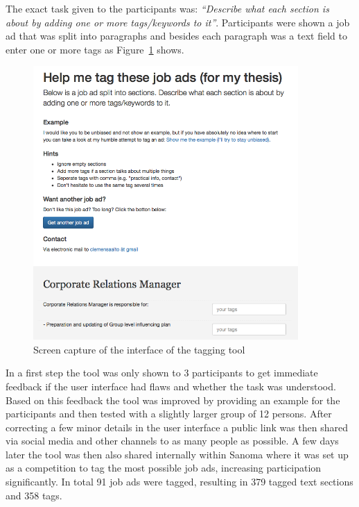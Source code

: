 The exact task given to the participants was: \emph{``Describe what each section is about by adding one or more tags/keywords to it''}. Participants were shown a job ad that was split into paragraphs and besides each paragraph was a text field to enter one or more tags as Figure~\ref{fig:thesis-tagger interface} shows.

\begin{figure}[h]
  \centering
  \includegraphics[width=0.9\textwidth]{img/thesis-tagger-interface.png}
  \caption{Screen capture of the interface of the tagging tool}
\label{fig:thesis-tagger interface}
\end{figure}

In a first step the tool was only shown to 3 participants to get immediate feedback if the user interface had flaws and whether the task was understood. Based on this feedback the tool was improved by providing an example for the participants and then tested with a slightly larger group of 12 persons. After correcting a few minor details in the user interface a public link was then shared via social media and other channels to as many people as possible. A few days later the tool was then also shared internally within Sanoma where it was set up as a competition to tag the most possible job ads, increasing participation significantly. In total 91 job ads were tagged, resulting in 379 tagged text sections and 358 tags.

